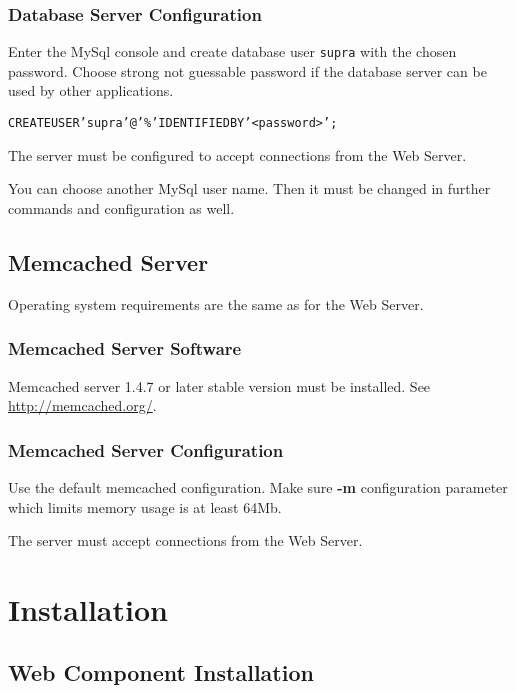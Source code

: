 \documentclass[12pt]{article}
\begin{document}
\subsubsection{Database Server Configuration}

Enter the MySql console and create database user \texttt{supra} with the chosen password. Choose strong not guessable password if the database server can be used by other applications.

\begin{alltt}
CREATE USER 'supra'@'\%' IDENTIFIED BY '<password>';
\end{alltt}

The server must be configured to accept connections from the Web Server.

You can choose another MySql user name. Then it must be changed in further commands and configuration as well.

\subsection{Memcached Server}
Operating system requirements are the same as for the Web Server.

\subsubsection{Memcached Server Software}

Memcached server 1.4.7 or later stable version must be installed. See \url{http://memcached.org/}.

\subsubsection{Memcached Server Configuration}

Use the default memcached configuration. Make sure \textbf{-m} configuration parameter which limits memory usage is at least 64Mb.

The server must accept connections from the Web Server.

\section{Installation}

\subsection{Web Component Installation}
\end{document}
